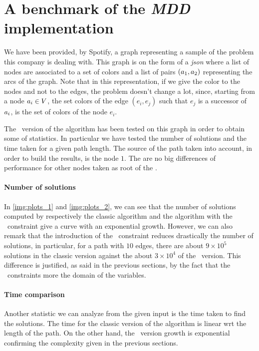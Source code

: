 \section{A benchmark of the \textit{MDD} implementation}

We have been provided, by Spotify, a graph representing a sample of the problem this company is dealing with. This graph is on the form of a \textit{json} where a list of nodes are associated to a set of colors and a list of pairs $(a_1, a_2)$ representing the arcs of the graph. Note that in this representation, if we give the color to the nodes and not to the edges, the problem doesn't change a lot, since, starting from a node $a_i \in V$, the set colors of the edge $(e_i, e_j)$ such that $e_j$ is a successor of $a_i$, is the set of colors of the node $e_i$.

The \mdd\ version of the algorithm has been tested on this graph in order to obtain some of statistics. In particular we have tested the number of solutions and the time taken for a given path length. The source of the path taken into account, in order to build the results, is the node $1$. The are no big differences of performance for other nodes taken as root of the \mdd.



\paragraph{Number of solutions}
In \cref{img:plots_1} and \cref{img:plots_2}, we can see that the number of solutions computed by respectively the classic algorithm and the algorithm with the \alldiff\ constraint give a curve with an exponential growth. However, we can also remark that the introduction of the \alldiff\ constraint reduces drastically the number of solutions, in particular, for a path with $10$ edges, there are about $9 \times 10^5$ solutions in the classic version against the about $3 \times 10^4$ of the \alldiff\ version. This difference is justified, as said in the previous sections, by the fact that the \alldiff\ constraints more the domain of the variables.

\paragraph{Time comparison} Another statistic we can analyze from the given input is the time taken to find the solutions. The time for the classic version of the algorithm is linear wrt the length of the path. On the other hand, the \alldiff\ version growth is exponential confirming the complexity given in the previous sections.

